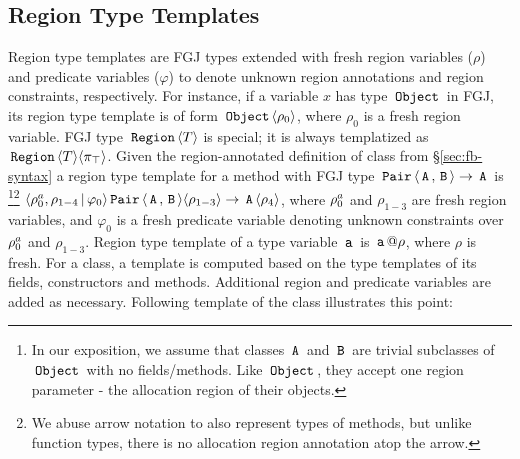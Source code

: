 \vspace*{-0.1in}
\subsection{Region Type Templates}
\label{sec:fb-templatization}

Region type templates are FGJ types extended with fresh region
variables ($\rho$) and predicate variables ($\varphi$) to denote
unknown region annotations and region constraints, respectively. For
instance, if a variable $x$ has type $\,{\tt Object}\,$ in FGJ, its region type
template is of form $\,{\tt Object}\,\langle \rho_0 \rangle$, where $\rho_0$ is a fresh
region variable. FGJ type $\,{\tt Region}\,\langle T \rangle$ is special; it is always
templatized as $\,{\tt Region}\,{\langle T \rangle}\langle \pi_{\top} \rangle$. Given the
region-annotated definition of  class from
\S\ref{sec:fb-syntax} a region type template for a method with FGJ
type $\,{\tt Pair}\,\langle \,{\tt A}\,,\,{\tt B}\, \rangle \rightarrow \,{\tt A}\,$ is \footnote{In
our exposition, we assume that classes $\,{\tt A}\,$ and $\,{\tt B}\,$ are trivial
subclasses of $\,{\tt Object}\,$ with no fields/methods. Like $\,{\tt Object}\,$, they
accept one region parameter - the allocation region of their
objects.}\footnote{We abuse arrow notation to also represent types of
methods, but unlike function types, there is no allocation region
annotation atop the arrow.}
$\langle \rho^a_0,\rho_{1-4} \,|\, \varphi_0 \rangle
\,{\tt Pair}\,\langle \,{\tt A}\,,\,{\tt B}\, \rangle \langle \rho_{1-3} \rangle \rightarrow
\,{\tt A}\,\langle \rho_4 \rangle$, where $\rho^a_0$ and $\rho_{1-3}$ are fresh
region variables, and $\varphi_0$ is a fresh predicate variable
denoting unknown constraints over $\rho^a_0$ and $\rho_{1-3}$.
Region type template of a type variable $\,{\tt a}\,$ is $\,{\tt a}\,@\rho$, where
$\rho$ is fresh. For a class, a template is computed based on the 
type templates of its fields, constructors and methods. Additional
region and predicate variables are added as necessary. Following template 
of the  class illustrates this point:
